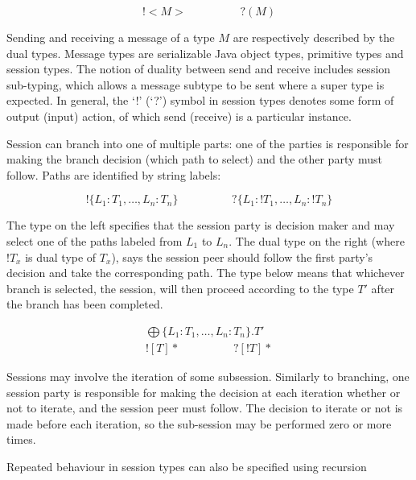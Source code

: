 \begin{equation*}
!<M> \hspace{2cm} ?(M)
\end{equation*}

Sending and receiving a message of a type $M$ are respectively described by the dual types. Message types are serializable Java object types, primitive types and session types. The notion of duality between send and receive includes session sub-typing, which allows a message subtype to be sent where a super type is expected. In general, the `!' (`?') symbol in session types denotes some form of output (input) action, of which send (receive) is a particular instance.

Session can branch into one of multiple parts: one of the parties is responsible for making the branch decision (which path to select) and the other party must follow. Paths are identified by string labels:

\begin{equation*}
!\{L_1:T_1,\dots, L_n:T_n\} \hspace{2cm} ?\{L_1:!T_1,\dots, L_n:!T_n \}
\end{equation*}

The type on the left specifies that the session party is decision maker and may select one of the paths labeled from $L_1$ to $L_n$. The dual type on the right (where $!T_x$ is dual type of $T_x$), says the session peer should follow the first party's decision and take the corresponding path. The type below means that whichever branch is selected, the session, will then proceed according to the type $T'$ after the branch has been completed.

\begin{equation*}
\begin{array}{c}
\bigoplus \{L_1:T_1,\dots, L_n:T_n\}.T' \\
![T]* \hspace{2cm} ?[!T]*
\end{array}
\end{equation*}

Sessions may involve the iteration of some subsession. Similarly to branching, one session party is responsible for making the decision at each iteration whether or not to iterate, and the session peer must follow. The decision to iterate or not is made before each iteration, so the sub-session may be performed zero or more times.

Repeated behaviour in session types can also be specified using recursion

